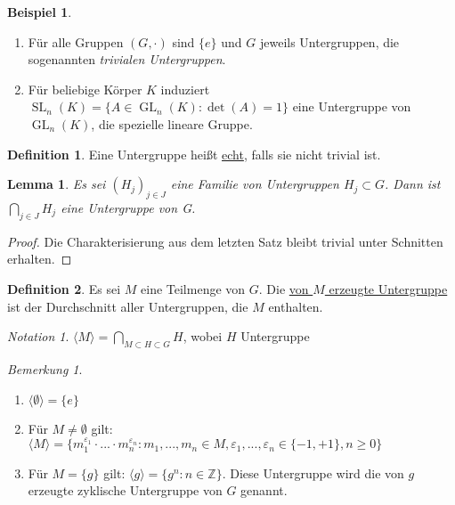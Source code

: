 \documentclass[12pt]{scrartcl} %
\DeclareMathOperator{\GL}{GL}
\DeclareMathOperator{\SL}{SL}
\newtheorem{lemma}{Lemma}
\theoremstyle{definition}
\newtheorem*{defn}{Definition}
\newtheorem{ex}{Beispiel}
\theoremstyle{remark}
\newtheorem*{notation}{Notation}
\newtheorem*{nb}{Bemerkung}
\begin{document}
\begin{ex}
	\begin{enumerate}[label=(\alph*)]
	\item Für alle Gruppen $(G,\cdot)$ sind $\{e\}$ und $G$ jeweils Untergruppen, die sogenannten \emph{trivialen Untergruppen}.
	\item Für beliebige Körper $K$ induziert $\SL_n(K)=\{A\in \GL_n(K): \det(A)=1\}$ eine Untergruppe von $\GL_n(K)$, die spezielle lineare Gruppe.
	\end{enumerate}
\end{ex}

\begin{defn}
	Eine Untergruppe heißt \underline{echt}, falls sie nicht trivial ist.
\end{defn}

\begin{lemma}
	Es sei $(H_{j})_{j \in J}$ eine Familie von Untergruppen $H_{j} \subset G$.
	Dann ist $\bigcap_{j \in J}H_{j}$ eine Untergruppe von G.
\end{lemma}

\begin{proof}
	Die Charakterisierung aus dem letzten Satz bleibt trivial unter Schnitten erhalten.
\end{proof}

\begin{defn}
	Es sei $M$ eine Teilmenge von $G$.
	Die \underline{von $M$ erzeugte Untergruppe} ist der Durchschnitt aller Untergruppen, die $M$ enthalten.
\end{defn}

\begin{notation}
	$\langle M \rangle =\bigcap_{M \subset H \subset G}H$, wobei $H$ Untergruppe
\end{notation}

\begin{nb}
	\begin{enumerate}[label=(\alph*)]
	\item $\langle \emptyset \rangle = \lbrace e \rbrace$
	\item Für $M \neq \emptyset$ gilt: $\langle M \rangle = \lbrace m_{1}^{\varepsilon_{1}} \cdot ... \cdot m_{n}^{\varepsilon_{n}} : m_{1},...,m_{n} \in M, \varepsilon_{1},...,\varepsilon_{n} \in \lbrace -1,+1\rbrace, n \geq 0 \rbrace$
	\item Für $M = \lbrace g \rbrace$ gilt: $\langle g \rangle = \lbrace g^{n} : n \in \mathbb{Z} \rbrace$. Diese Untergruppe wird die von $g$ erzeugte zyklische Untergruppe von $G$ genannt.
	\end{enumerate}
\end{nb}
\end{document}
